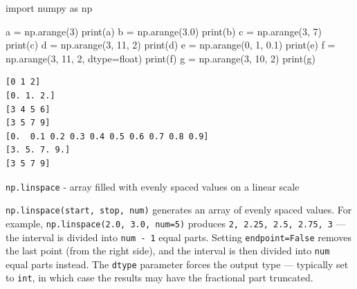 \documentclass[
  english,
  letterpaper,
  DIV=11,
  numbers=noendperiod]{scrreprt}
\newenvironment{Shaded}{\begin{snugshade}}{\end{snugshade}}
\newcommand{\BuiltInTok}[1]{\textcolor[rgb]{0.00,0.23,0.31}{#1}}
\newcommand{\DecValTok}[1]{\textcolor[rgb]{0.68,0.00,0.00}{#1}}
\newcommand{\FloatTok}[1]{\textcolor[rgb]{0.68,0.00,0.00}{#1}}
\newcommand{\ImportTok}[1]{\textcolor[rgb]{0.00,0.46,0.62}{#1}}
\newcommand{\NormalTok}[1]{\textcolor[rgb]{0.00,0.23,0.31}{#1}}
\newcommand{\OperatorTok}[1]{\textcolor[rgb]{0.37,0.37,0.37}{#1}}
\begin{document}
\begin{Shaded}
\begin{Highlighting}[]
\ImportTok{import}\NormalTok{ numpy }\ImportTok{as}\NormalTok{ np}

\NormalTok{a }\OperatorTok{=}\NormalTok{ np.arange(}\DecValTok{3}\NormalTok{)}
\BuiltInTok{print}\NormalTok{(a)}
\NormalTok{b }\OperatorTok{=}\NormalTok{ np.arange(}\FloatTok{3.0}\NormalTok{)}
\BuiltInTok{print}\NormalTok{(b)}
\NormalTok{c }\OperatorTok{=}\NormalTok{ np.arange(}\DecValTok{3}\NormalTok{, }\DecValTok{7}\NormalTok{)}
\BuiltInTok{print}\NormalTok{(c)}
\NormalTok{d }\OperatorTok{=}\NormalTok{ np.arange(}\DecValTok{3}\NormalTok{, }\DecValTok{11}\NormalTok{, }\DecValTok{2}\NormalTok{)}
\BuiltInTok{print}\NormalTok{(d)}
\NormalTok{e }\OperatorTok{=}\NormalTok{ np.arange(}\DecValTok{0}\NormalTok{, }\DecValTok{1}\NormalTok{, }\FloatTok{0.1}\NormalTok{)}
\BuiltInTok{print}\NormalTok{(e)}
\NormalTok{f }\OperatorTok{=}\NormalTok{ np.arange(}\DecValTok{3}\NormalTok{, }\DecValTok{11}\NormalTok{, }\DecValTok{2}\NormalTok{, dtype}\OperatorTok{=}\BuiltInTok{float}\NormalTok{)}
\BuiltInTok{print}\NormalTok{(f)}
\NormalTok{g }\OperatorTok{=}\NormalTok{ np.arange(}\DecValTok{3}\NormalTok{, }\DecValTok{10}\NormalTok{, }\DecValTok{2}\NormalTok{)}
\BuiltInTok{print}\NormalTok{(g)}
\end{Highlighting}
\end{Shaded}

\begin{verbatim}
[0 1 2]
[0. 1. 2.]
[3 4 5 6]
[3 5 7 9]
[0.  0.1 0.2 0.3 0.4 0.5 0.6 0.7 0.8 0.9]
[3. 5. 7. 9.]
[3 5 7 9]
\end{verbatim}

\texttt{np.linspace} - array filled with evenly spaced values on a
linear scale

\texttt{np.linspace(start,\ stop,\ num)} generates an array of evenly
spaced values. For example, \texttt{np.linspace(2.0,\ 3.0,\ num=5)}
produces \texttt{2,\ 2.25,\ 2.5,\ 2.75,\ 3} --- the interval is divided
into \texttt{num\ -\ 1} equal parts. Setting \texttt{endpoint=False}
removes the last point (from the right side), and the interval is then
divided into \texttt{num} equal parts instead. The \texttt{dtype}
parameter forces the output type --- typically set to \texttt{int}, in
which case the results may have the fractional part truncated.
\end{document}
